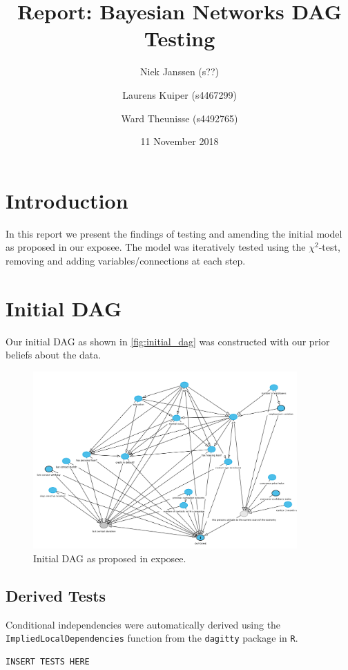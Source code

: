 \documentclass[11pt]{article}
\title{Report: Bayesian Networks DAG Testing}
\date{11 November 2018}
\author{Niek Janssen (s??)\and Laurens Kuiper (s4467299)\and Ward Theunisse (s4492765)}
\begin{document}
\maketitle
\thispagestyle{empty}
\newpage
\section{Introduction}
In this report we present the findings of testing and amending the initial model as proposed in our exposee.
The model was iteratively tested using the $\chi^2$-test, removing and adding variables/connections at each step.

\section{Initial DAG}
Our initial DAG as shown in \autoref{fig:initial_dag} was constructed with our prior beliefs about the data.

\begin{figure}[h]
	\centering
	\includegraphics[width=0.9\textwidth]{images/initial_dag}
	\caption{Initial DAG as proposed in exposee.}
	\label{fig:initial_dag}
\end{figure}

\subsection{Derived Tests}
Conditional independencies were automatically derived using the \texttt{ImpliedLocalDependencies} function from the \texttt{dagitty} package in \texttt{R}.
\begin{verbatim}
INSERT TESTS HERE
\end{verbatim}
\end{document}
